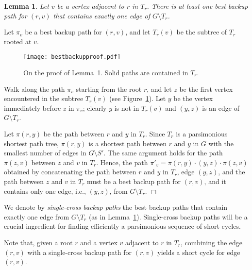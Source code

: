 \documentclass{article}
\newtheorem{lemma}[theorem]{Lemma}
\newcommand{\qed}{\hfill \ensuremath{\Box}}
\newenvironment{proof}{\vspace{1ex}\noindent{\bf Proof.}\hspace{0.5em}}
	{\hfill\qed\vspace{2ex}}
\newcommand{\commento}[1] {}
\begin{document}
\begin{lemma}\label{le:bestbackup}
Let $v$ be a vertex adjacent to $r$ in $T_r$. There is at least one best backup path for $(r,v)$ that contains exactly one edge of $G\setminus T_r$.
\end{lemma}
\begin{proof}
Let $\pi_v$ be a best backup path for $(r,v)$, and let $T_r(v)$ be the subtree of $T_r$ rooted at $v$.
\begin{figure}[t]
\begin{center}
\texttt{[image: bestbackupproof.pdf]}
\end{center}
\caption{On the proof of Lemma~\ref{le:bestbackup}. Solid paths are contained in $T_r$.}\protect\label{fi:bestbackup}
\end{figure}
Walk along the path $\pi_v$ starting from the root $r$, and let $z$ be the first vertex encountered in the subtree $T_r(v)$
 (see Figure~\ref{fi:bestbackup}). Let  $y$ be the vertex immediately before $z$ in $\pi_v$; clearly $y$ is not in $T_r(v)$ and  $(y,z)$ is an edge of $G \setminus T_r$.

Let $\pi(r,y)$ be the path between $r$ and $y$ in $T_r$.
Since $T_r$ is a parsimonious shortest path tree, $\pi(r,y)$ 
is a shortest path between $r$ and $y$ in $G$ with the smallest number of edges in $G\setminus S'$.
The same argument holds for the path $\pi(z,v)$ between $z$ and $v$ in $T_r$.
Hence, the path $\pi'_v=\pi(r,y)\cdot (y,z)\cdot \pi(z,v)$ obtained by concatenating the path between $r$ and $y$ in $T_r$, edge $(y,z)$, and the path between $z$ and $v$ in $T_r$ 
must be a best backup path for $(r,v)$, and it contains only one edge, i.e., $(y,z)$, from $G \setminus T_r$.
\end{proof}

We denote by \emph{single-cross backup paths} the best backup paths
that contain exactly one edge from $G\setminus T_r$ (as in Lemma~\ref{le:bestbackup}). Single-cross backup paths will be a crucial ingredient for finding efficiently a parsimonious sequence of short cycles.
\commento{For each vertex $x$ we define:
\begin{itemize}
\item $\vartheta_r(x)$: the length of the current best backup path from $r$ to $x$;
\item $p_{\vartheta,r}(x)$: the vertex preceding $x$ in the current best backup path from $r$ to $x$;
\item $k_{\vartheta,r}(x)$: the number of edges from $G\setminus R$ in the current best backup path from $r$ to $x$.
\end{itemize}
Values of $\vartheta_r(x)$ and $k_{\vartheta,r}(x)$ are computed by Algorithm~\ref{pr:backuppaths}.
}
Note that, given a root $r$ and a vertex $v$ adjacent to $r$ in $T_r$, combining the edge $(r,v)$ with a single-cross backup path for $(r,v)$ yields a short cycle for edge $(r,v)$. 
\end{document}
